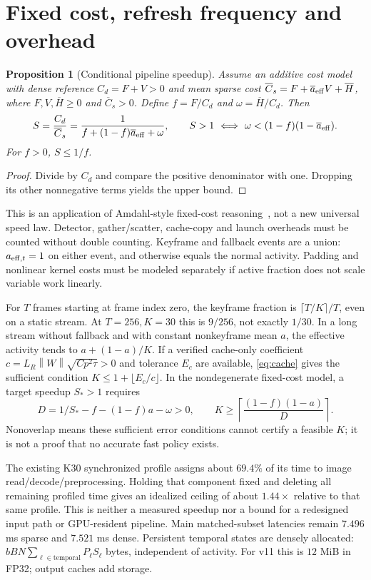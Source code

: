\documentclass[11pt]{article}
\newtheorem{proposition}{Proposition}
\newcommand{\norm}[1]{\left\lVert#1\right\rVert}
\begin{document}
\section{Fixed cost, refresh frequency and overhead}
\begin{proposition}[Conditional pipeline speedup]\label{prop:cost}
Assume an additive cost model with dense reference $C_d=F+V>0$ and mean
sparse cost $\overline C_s=F+\overline a_{\rm eff}V+\overline H$, where
$F,V,\overline H\ge0$ and $\overline C_s>0$.
Define $f=F/C_d$ and $\omega=\overline H/C_d$.
Then
\begin{equation}
 S=\frac{C_d}{\overline C_s}
 =\frac1{f+(1-f)\overline a_{\rm eff}+\omega},\qquad
 S>1\ \Longleftrightarrow\ \omega<(1-f)(1-\overline a_{\rm eff}).
\end{equation}
For $f>0$, $S\le1/f$.
\end{proposition}
\begin{proof}
Divide by $C_d$ and compare the positive denominator with one.
Dropping its other nonnegative terms yields the upper bound.
\end{proof}

This is an application of Amdahl-style fixed-cost reasoning~\cite{amdahl1967},
not a new universal speed law. Detector, gather/scatter, cache-copy and launch
overheads must be counted without double counting. Keyframe and fallback
events are a union: $a_{{\rm eff},t}=1$ on either event, and otherwise equals
the normal activity. Padding and nonlinear kernel costs must be modeled
separately if active fraction does not scale variable work linearly.

For $T$ frames starting at frame index zero, the keyframe fraction is
$\lceil T/K\rceil/T$, even on a static stream. At $T=256,K=30$ this is
$9/256$, not exactly $1/30$. In a long stream without fallback and with
constant nonkeyframe mean $a$, the effective activity tends to
$a+(1-a)/K$. If a verified cache-only coefficient
$c=L_R\norm{W}\sqrt{Cp^2\tau}>0$ and tolerance $E_c$ are available,
\eqref{eq:cache} gives the sufficient condition
$K\le1+\lfloor E_c/c\rfloor$. In the nondegenerate fixed-cost model,
a target speedup $S_*>1$ requires
\begin{equation}
 D=1/S_*-f-(1-f)a-\omega>0,\qquad
 K\ge\left\lceil\frac{(1-f)(1-a)}{D}\right\rceil.
\end{equation}
Nonoverlap means these sufficient error conditions cannot certify a feasible
$K$; it is not a proof that no accurate fast policy exists.

The existing K30 synchronized profile assigns about $69.4\%$ of its time
to image read/decode/preprocessing. Holding that component fixed and deleting
all remaining profiled time gives an idealized ceiling of about $1.44\times$
relative to that same profile. This is neither a measured speedup nor a bound
for a redesigned input path or GPU-resident pipeline. Main matched-subset
latencies remain $7.496$ ms sparse and $7.521$ ms dense.
Persistent temporal states are densely allocated:
$bBN\sum_{\ell\in\mathrm{temporal}}P_\ell S_\ell$ bytes, independent of activity.
For v11 this is $12$ MiB in FP32; output caches add storage.
\end{document}
